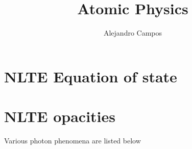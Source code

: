 \documentclass[a4paper,11pt]{article}
\title{Atomic Physics}
\author{Alejandro Campos}
\begin{document}
\maketitle
\tableofcontents

\section{NLTE Equation of state}

\section{NLTE opacities}
Various photon phenomena are listed below
\end{document}
